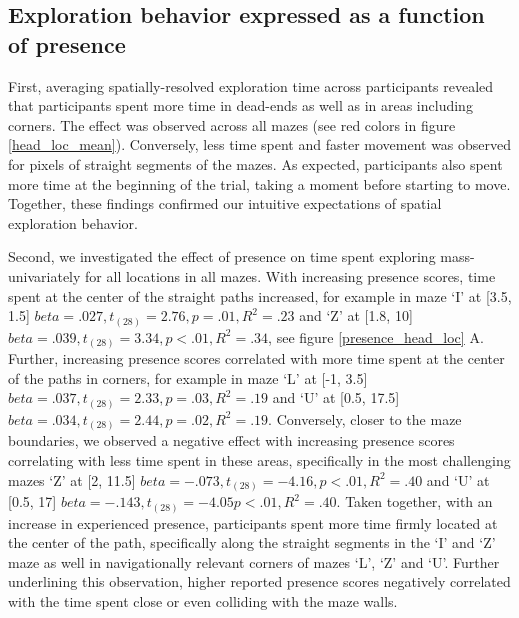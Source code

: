 \subsection{Exploration behavior expressed as a function of presence} 
First, averaging spatially-resolved exploration time across participants revealed that participants spent more time in dead-ends as well as in areas including corners. The effect was observed across all mazes (see red colors in figure \ref{head_loc_mean}). Conversely, less time spent and faster movement was observed for pixels of straight segments of the mazes. As expected, participants also spent more time at the beginning of the trial, taking a moment before starting to move. Together, these findings confirmed our intuitive expectations of spatial exploration behavior. 

Second, we investigated the effect of presence on time spent exploring mass-univariately for all locations in all mazes. With increasing presence scores, time spent at the center of the straight paths increased, for example in maze `I' at [3.5, 1.5] $beta=.027, t_{(28)}=2.76, p=.01, R^2=.23$ and `Z' at [1.8, 10] $beta=.039, t_{(28)}=3.34, p<.01, R^2=.34$, see figure \ref{presence_head_loc} A. Further, increasing presence scores correlated with more time spent at the center of the paths in corners, for example in maze `L' at [-1, 3.5] $beta=.037, t_{(28)}=2.33, p=.03, R^2=.19$ and `U' at [0.5, 17.5] $beta=.034, t_{(28)}=2.44, p=.02, R^2=.19$. Conversely, closer to the maze boundaries, we observed a negative effect with increasing presence scores correlating with less time spent in these areas, specifically in the most challenging mazes `Z' at [2, 11.5] $beta=-.073, t_{(28)}=-4.16, p<.01, R^2=.40$ and `U' at [0.5, 17] $beta=-.143, t_{(28)}=-4.05 p<.01, R^2=.40$. Taken together, with an increase in experienced presence, participants spent more time firmly located at the center of the path, specifically along the straight segments in the `I' and `Z' maze as well in navigationally relevant corners of mazes `L', `Z' and `U'. Further underlining this observation, higher reported presence scores negatively correlated with the time spent close or even colliding with the maze walls.